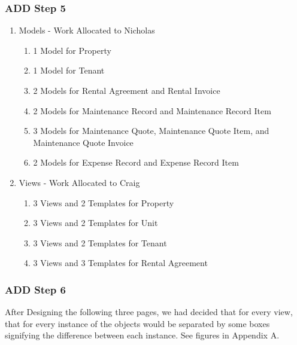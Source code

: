 \documentclass[11pt]{article}
\begin{document}
        \subsubsection{ADD Step 5}
            \begin{enumerate}
                \item Models - Work Allocated to Nicholas
                \begin{enumerate}
                    \item 1 Model for Property
                    \item 1 Model for Tenant
                    \item 2 Models for Rental Agreement and Rental Invoice
                    \item 2 Models for Maintenance Record and Maintenance Record Item
                    \item 3 Models for Maintenance Quote, Maintenance Quote Item, and Maintenance Quote Invoice
                    \item 2 Models for Expense Record and Expense Record Item
                \end{enumerate}
                \item Views - Work Allocated to Craig
                    \begin{enumerate}
                        \item 3 Views and 2 Templates for Property
                        \item 3 Views and 2 Templates for Unit
                        \item 3 Views and 2 Templates for Tenant
                        \item 3 Views and 3 Templates for Rental Agreement
                    \end{enumerate}              
            \end{enumerate}
        \subsubsection{ADD Step 6}
        After Designing the following three pages, we had decided that for every view, that for every instance of the objects would be separated by some boxes signifying the difference between each instance. See figures in Appendix A.
            
\end{document}
